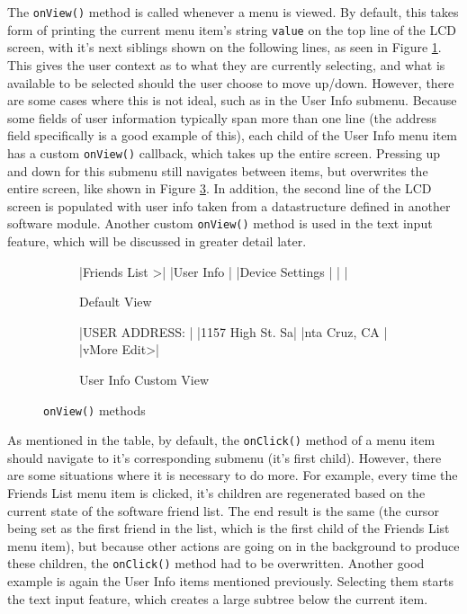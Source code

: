 \documentclass[journal,compsoc]{IEEEtran}
\begin{document}
The \lstinline[columns=fixed]{onView()} method is called whenever a menu is viewed. By default, this takes form of printing the current menu item's string \lstinline[columns=fixed]{value} on the top line of the LCD screen, with it's next siblings shown on the following lines, as seen in Figure \ref{menu view default}. This gives the user context as to what they are currently selecting, and what is available to be selected should the user choose to move up/down. However, there are some cases where this is not ideal, such as in the User Info submenu. Because some fields of user information typically span more than one line (the address field specifically is a good example of this), each child of the User Info menu item has a custom \lstinline[columns=fixed]{onView()} callback, which takes up the entire screen. Pressing up and down for this submenu still navigates between items, but overwrites the entire screen, like shown in Figure \ref{menu view user info}. In addition, the second line of the LCD screen is populated with user info taken from a datastructure defined in another software module. Another custom \lstinline[columns=fixed]{onView()} method is used in the text input feature, which will be discussed in greater detail later.

\begin{figure}
  \begin{subfigure}{0.48\textwidth}
  	\centering
     |Friends List   >|
                |User Info       |
                |Device Settings |
                |                |
    \caption{Default View}
    \label{menu view default}
  \end{subfigure}
  \begin{subfigure}{0.48\textwidth}
    \centering
     |USER ADDRESS:   |
                |1157 High St. Sa|
                |nta Cruz, CA    |
                |vMore      Edit>|
    \caption{User Info Custom View}
    \label{menu view user info}
  \end{subfigure}
  \caption{\lstinline[columns=fixed]{onView()} methods}
\end{figure}

As mentioned in the table, by default, the \lstinline[columns=fixed]{onClick()} method of a menu item should navigate to it's corresponding submenu (it's first child). However, there are some situations where it is necessary to do more. For example, every time the Friends List menu item is clicked, it's children are regenerated based on the current state of the software friend list. The end result is the same (the cursor being set as the first friend in the list, which is the first child of the Friends List menu item), but because other actions are going on in the background to produce these children, the \lstinline[columns=fixed]{onClick()} method had to be overwritten. Another good example is again the User Info items mentioned previously. Selecting them starts the text input feature, which creates a large subtree below the current item.
\end{document}
